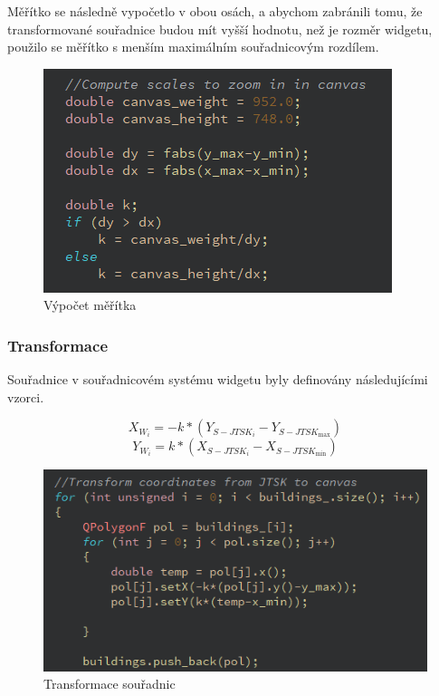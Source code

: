 \documentclass[11pt]{article}
\begin{document}
 Měřítko se následně vypočetlo v obou osách, a abychom zabránili tomu, že transformované souřadnice budou mít vyšší hodnotu, než je rozměr widgetu, použilo se měřítko s menším maximálním souřadnicovým rozdílem.

\begin{figure}[htbh]
	\centering
	\includegraphics[scale=1]{images/U2_problem_meritko2.png} 
	\caption{Výpočet měřítka}
	\label{fig:problem_scale2}
\end{figure} 

\subsubsection{Transformace}
Souřadnice v souřadnicovém systému widgetu byly definovány následujícími vzorci.

\begin{equation}
X_{W_{i}}=-k *\left(Y_{S-J T S K_{i}}-Y_{S-J T S K_{\max }}\right)
\end{equation}
\begin{equation}
Y_{W_{i}}=k *\left(X_{S-J T S K_{i}}-X_{S-J T S K_{\min }}\right)
\end{equation}

\begin{figure}[htbh]
	\centering
	\includegraphics[scale=1]{images/U2_problem_transformace.png} 
	\caption{Transformace souřadnic}
	\label{fig:problem_transformation}
\end{figure} 
\end{document}
